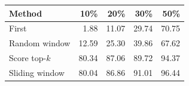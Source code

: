 \begin{tabular}{lrrrr}
\toprule
Method & 10\% & 20\% & 30\% & 50\%\\

\midrule
First & 1.88 & 11.07 & 29.74 & 70.75\\
Random window & 12.59 & 25.30 & 39.86 & 67.62\\
Score top-$k$ & 80.34 & 87.06 & 89.72 & 94.37\\
Sliding window & 80.04 & 86.86 & 91.01 & 96.44\\
\bottomrule
\end{tabular}
